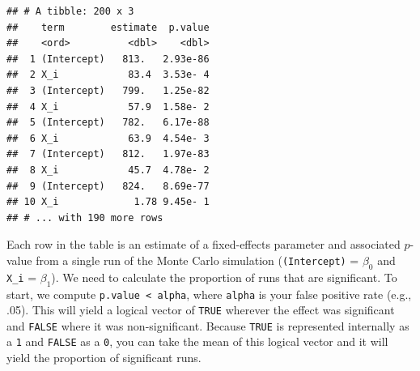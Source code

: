 \documentclass[
  english,
  doc,floatsintext]{apa6}
\newenvironment{Shaded}{\begin{snugshade}}{\end{snugshade}}
\newcommand{\CommentTok}[1]{\textcolor[rgb]{0.56,0.35,0.01}{\textit{#1}}}
\newcommand{\DataTypeTok}[1]{\textcolor[rgb]{0.13,0.29,0.53}{#1}}
\newcommand{\FloatTok}[1]{\textcolor[rgb]{0.00,0.00,0.81}{#1}}
\newcommand{\KeywordTok}[1]{\textcolor[rgb]{0.13,0.29,0.53}{\textbf{#1}}}
\newcommand{\NormalTok}[1]{#1}
\newcommand{\OperatorTok}[1]{\textcolor[rgb]{0.81,0.36,0.00}{\textbf{#1}}}
\newcommand{\StringTok}[1]{\textcolor[rgb]{0.31,0.60,0.02}{#1}}
\begin{document}
\begin{verbatim}
## # A tibble: 200 x 3
##    term        estimate  p.value
##    <ord>          <dbl>    <dbl>
##  1 (Intercept)   813.   2.93e-86
##  2 X_i            83.4  3.53e- 4
##  3 (Intercept)   799.   1.25e-82
##  4 X_i            57.9  1.58e- 2
##  5 (Intercept)   782.   6.17e-88
##  6 X_i            63.9  4.54e- 3
##  7 (Intercept)   812.   1.97e-83
##  8 X_i            45.7  4.78e- 2
##  9 (Intercept)   824.   8.69e-77
## 10 X_i             1.78 9.45e- 1
## # ... with 190 more rows
\end{verbatim}

\noindent Each row in the table is an estimate of a fixed-effects parameter and associated \(p\)-value from a single run of the Monte Carlo simulation (\texttt{(Intercept)} = \(\beta_0\) and \texttt{X\_i} = \(\beta_1\)). We need to calculate the proportion of runs that are significant. To start, we compute \texttt{p.value\ \textless{}\ alpha}, where \texttt{alpha} is your false positive rate (e.g., .05). This will yield a logical vector of \texttt{TRUE} wherever the effect was significant and \texttt{FALSE} where it was non-significant. Because \texttt{TRUE} is represented internally as a \texttt{1} and \texttt{FALSE} as a \texttt{0}, you can take the mean of this logical vector and it will yield the proportion of significant runs.

\begin{Shaded}
\end{Shaded}
\end{document}

